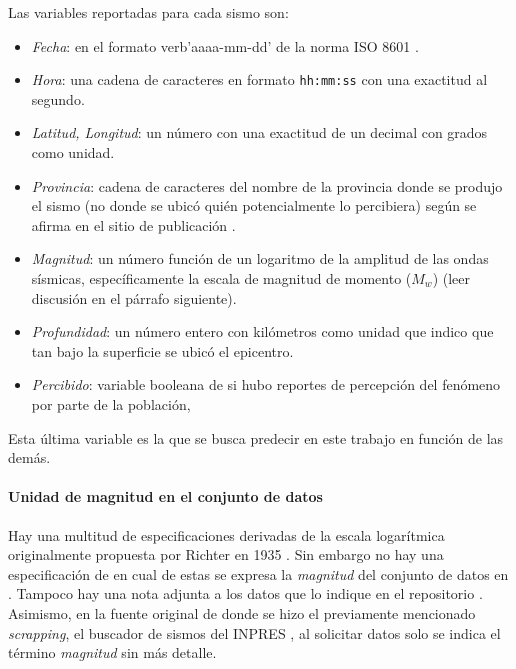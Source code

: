 \documentclass[a4paper]{report}
\begin{document}
Las variables reportadas para cada sismo son:
\begin{itemize}
	\item \emph{Fecha}: en el formato verb'aaaa-mm-dd' de la norma ISO 8601 \cite{noauthor_iso_2019}.
	\item \emph{Hora}: una cadena de caracteres en formato \verb'hh:mm:ss' con una exactitud al segundo.
	\item \emph{Latitud, Longitud}: un número con una exactitud de un decimal con grados como unidad.
	\item \emph{Provincia}: cadena de caracteres del nombre de la provincia donde se produjo el sismo (no donde se ubicó quién potencialmente lo percibiera) según se afirma en el sitio de publicación \cite[5.1.1]{daniela_parada_ic-datasets-docencia_nodate}.
	\item \emph{Magnitud}: un número función de un logaritmo de la amplitud de las ondas sísmicas, específicamente la escala de magnitud de momento (\(M_w\)) (leer discusión en el párrafo siguiente).
	\item \emph{Profundidad}: un número entero con kilómetros como unidad que indico que tan bajo la superficie se ubicó el epicentro.
	\item \emph{Percibido}: variable booleana de si hubo reportes de percepción del fenómeno por parte de la población, 
\end{itemize}
Esta última variable es la que se busca predecir en este trabajo en función de las demás. 

\paragraph{Unidad de magnitud en el conjunto de datos}

Hay una multitud de especificaciones derivadas de la escala logarítmica originalmente propuesta por Richter en 1935 \cite[sección 4.2.3]{fowler_solid_1990}.
Sin embargo no hay una especificación de en cual de estas se expresa la \emph{magnitud} del conjunto de datos en \cite{daniela_parada_ic-datasets-docencia_nodate}.
Tampoco hay una nota adjunta a los datos que lo indique en el repositorio \cite{daniela_parada_sismos-arg_nodate}. 
Asimismo, en la fuente original de donde se hizo el previamente mencionado \emph{scrapping}, el buscador de sismos del INPRES \cite{noauthor_buscador_nodate}, al solicitar datos solo se indica el término \emph{magnitud} sin más detalle.
\end{document}
